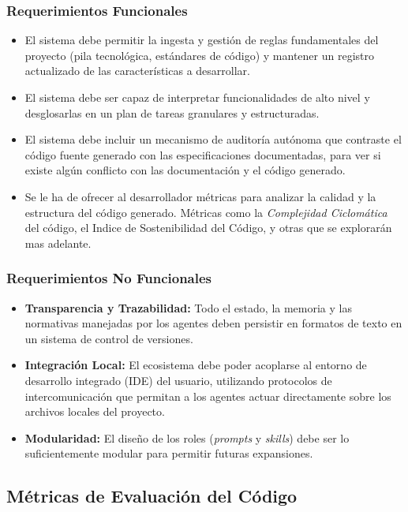 \documentclass[11pt, letterpaper]{article}
\begin{document}
\subsubsection{Requerimientos Funcionales}
\begin{itemize}
    \item El sistema debe permitir la ingesta y gestión de reglas fundamentales del proyecto (pila tecnológica, estándares de código) y mantener un registro actualizado de las características a desarrollar.
    \item El sistema debe ser capaz de interpretar funcionalidades de alto nivel y desglosarlas en un plan de tareas granulares y estructuradas.
    \item El sistema debe incluir un mecanismo de auditoría autónoma que contraste el código fuente generado con las especificaciones documentadas, para ver si existe algún conflicto con las documentación y el código generado.
    \item Se le ha de ofrecer al desarrollador métricas para analizar la calidad y la estructura del código generado. Métricas como la \textit{Complejidad Ciclomática}\cite{McCabe_Complexity} del código, el Indice de Sostenibilidad del Código, y otras que se explorarán mas adelante.
\end{itemize}

\subsubsection{Requerimientos No Funcionales}
\begin{itemize}
    \item \textbf{Transparencia y Trazabilidad:} Todo el estado, la memoria y las normativas manejadas por los agentes deben persistir en formatos de texto en un sistema de control de versiones.
    \item \textbf{Integración Local:} El ecosistema debe poder acoplarse al entorno de desarrollo integrado (IDE) del usuario, utilizando protocolos de intercomunicación que permitan a los agentes actuar directamente sobre los archivos locales del proyecto.
    \item \textbf{Modularidad:} El diseño de los roles (\textit{prompts} y \textit{skills}) debe ser lo suficientemente modular para permitir futuras expansiones.
\end{itemize}

\subsection{Métricas de Evaluación del Código}
\end{document}
